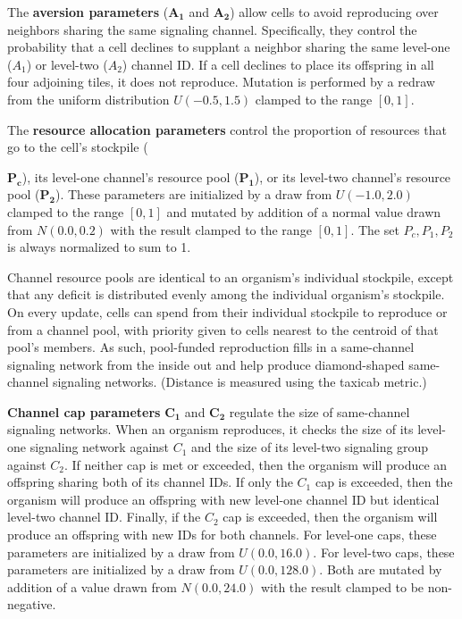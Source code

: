 The \textbf{aversion parameters} ($\bm{A_1}$ and $\bm{A_2}$) allow cells to avoid reproducing over neighbors sharing the same signaling channel.
Specifically, they control the probability that a cell declines to supplant a neighbor sharing the same level-one ($A_1$) or level-two ($A_2$) channel ID.
If a cell declines to place its offspring in all four adjoining tiles, it does not reproduce.
Mutation is performed by a redraw from the uniform distribution $U(-0.5,1.5)$ clamped to the range $[0,1]$.

The \textbf{resource allocation parameters} control the proportion of resources that go to the cell's stockpile ({$\bm{P_{c}}$), its level-one channel's resource pool ($\bm{P_1}$), or its level-two channel's resource pool ($\bm{P_2}$).
These parameters are initialized by a draw from $U(-1.0, 2.0)$ clamped to the range $[0,1]$ and mutated by addition of a normal value drawn from $N(0.0,0.2)$ with the result clamped to the range $[0,1]$.
The set $P_{c}, P_1, P_2$ is always normalized to sum to 1.

Channel resource pools are identical to an organism's individual stockpile, except that any deficit is distributed evenly among the individual organism's stockpile.
On every update, cells can spend from their individual stockpile to reproduce or from a channel pool, with priority given to cells nearest to the centroid of that pool's members.
As such, pool-funded reproduction fills in a same-channel signaling network from the inside out and help produce diamond-shaped same-channel signaling networks.
(Distance is measured using the taxicab metric.)

\textbf{Channel cap parameters} $\bm{C_1}$ and $\bm{C_2}$ regulate the size of same-channel signaling networks.
When an organism reproduces, it checks the size of its level-one signaling network against $C_1$ and the size of its level-two signaling group against $C_2$.
If neither cap is met or exceeded, then the organism will produce an offspring sharing both of its channel IDs.
If only the $C_1$ cap is exceeded, then the organism will produce an offspring with new level-one channel ID but identical level-two channel ID.
Finally, if the $C_2$ cap is exceeded, then the organism will produce an offspring with new IDs for both channels.
For level-one caps, these parameters are initialized by a draw from $U(0.0, 16.0)$.
For level-two caps, these parameters are initialized by a draw from $U(0.0, 128.0)$.
Both are mutated by addition of a value drawn from $N(0.0,24.0)$ with the result clamped to be non-negative.

}
